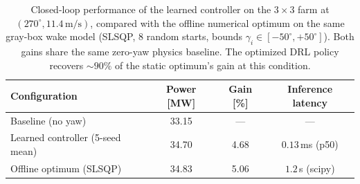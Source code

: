 \documentclass[final,5p,times]{elsarticle}
\begin{document}
\begin{table}[h]
\centering
\caption{Closed-loop performance of the learned controller on the $3{\times}3$ farm at $(270^\circ, 11.4\,\mathrm{m/s})$, compared with the offline numerical optimum on the same gray-box wake model (SLSQP, $8$ random starts, bounds $\gamma_i\!\in\![-50^\circ,+50^\circ]$). Both gains share the same zero-yaw physics baseline. The optimized DRL policy recovers $\sim\!90\%$ of the static optimum's gain at this condition.}
\label{tab:closed_loop}
\small
\begin{tabular}{lccc}
\toprule
Configuration & Power [MW] & Gain [\%] & Inference latency \\
\midrule
Baseline (no yaw) & 33.15 & --- & --- \\
Learned controller (5-seed mean) & 34.70 & 4.68 & $0.13$\,ms (p50) \\
Offline optimum (SLSQP) & 34.83 & 5.06 & $1.2$\,s (scipy) \\
\bottomrule
\end{tabular}
\end{table}
\end{document}
